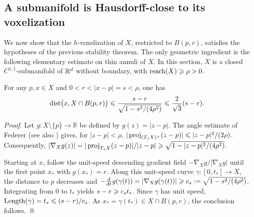 \subsection{A submanifold is Hausdorff-close to its voxelization}

We now show that the $h$-voxelization of $X$, restricted to $B(p,r)$,
satisfies the hypotheses of the previous stability theorem.  The only
geometric ingredient is the following elementary estimate on thin
annuli of $X$.  In this section, $X$ is a closed $C^{1,1}$-submanifold
of $\mathbb{R}^d$ without boundary, with $\operatorname{reach}(X)\geqslant\rho>0$.


\begin{lemma}%
  \label{lem:radial-annulus}
For any $p,x\in X$ and $0<r<|x-p|=s<\rho$, one has
\begin{equation}\label{eq:radial-annulus}
\operatorname{dist}\bigl(x,X\cap B(p,r)\bigr)
\leqslant
\frac{s-r}{\sqrt{1-s^2/(4\rho^2)}}
\leqslant \frac{2}{\sqrt3}(s-r).
\end{equation}
\end{lemma}
\begin{proof}
Let $g:X\setminus\{p\}\to\mathbb R$ be defined by
$g(z)=|z-p|$. The angle estimate of Federer
(see also \cite[Lemma~9]{lieutier2024manifolds})
gives, for $|z-p|<\rho$,
$|\operatorname{proj}_{(T_zX)^\perp}(z-p)|
\leqslant |z-p|^2/(2\rho)$.
Consequently,
$|\nabla_X g(z)|
=|\operatorname{proj}_{T_zX}(z-p)|/|z-p|
\geqslant\sqrt{1-|z-p|^2/(4\rho^2)}$.


Starting at $x$, follow the unit-speed descending
gradient field $-\nabla_Xg/|\nabla_Xg|$ until the
first point $x_*$ with $g(x_*)=r$.
Along this unit-speed curve $\gamma:[0,t_*]\to X$,
the distance to $p$ decreases and
$-\frac{d}{dt}g(\gamma(t))
=|\nabla_Xg(\gamma(t))|
\geqslant c_s:=\sqrt{1-s^2/(4\rho^2)}$.
Integrating from $0$ to $t_*$ yields
$s-r\geqslant c_s t_*$.
Since $\gamma$ has unit speed,
$\operatorname{Length}(\gamma)=t_*
\leqslant(s-r)/c_s$.
As $x_*=\gamma(t_*)\in X\cap B(p,r)$,
the conclusion follows.
\qed
\end{proof}


